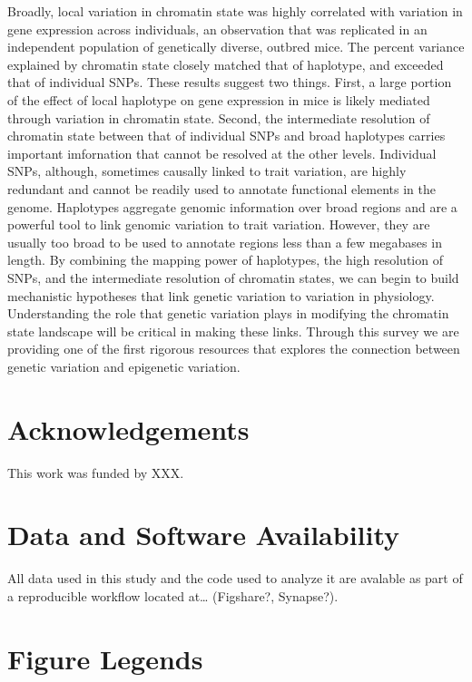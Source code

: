 \documentclass[10pt,letterpaper]{article}
\begin{document}
Broadly, local variation in chromatin state was highly correlated with
variation in gene expression across individuals, an observation that was
replicated in an independent population of genetically diverse, outbred
mice. The percent variance explained by chromatin state closely matched
that of haplotype, and exceeded that of individual SNPs. These results
suggest two things. First, a large portion of the effect of local
haplotype on gene expression in mice is likely mediated through
variation in chromatin state. Second, the intermediate resolution of
chromatin state between that of individual SNPs and broad haplotypes
carries important imfornation that cannot be resolved at the other
levels. Individual SNPs, although, sometimes causally linked to trait
variation, are highly redundant and cannot be readily used to annotate
functional elements in the genome. Haplotypes aggregate genomic
information over broad regions and are a powerful tool to link genomic
variation to trait variation. However, they are usually too broad to be
used to annotate regions less than a few megabases in length. By
combining the mapping power of haplotypes, the high resolution of SNPs,
and the intermediate resolution of chromatin states, we can begin to
build mechanistic hypotheses that link genetic variation to variation in
physiology. Understanding the role that genetic variation plays in
modifying the chromatin state landscape will be critical in making these
links. Through this survey we are providing one of the first rigorous
resources that explores the connection between genetic variation and
epigenetic variation.

\hypertarget{acknowledgements}{%
\section{Acknowledgements}\label{acknowledgements}}

This work was funded by XXX.

\hypertarget{data-and-software-availability}{%
\section{Data and Software
Availability}\label{data-and-software-availability}}

All data used in this study and the code used to analyze it are avalable
as part of a reproducible workflow located at\ldots{} (Figshare?,
Synapse?).

\hypertarget{figure-legends}{%
\section{Figure Legends}\label{figure-legends}}
\end{document}
